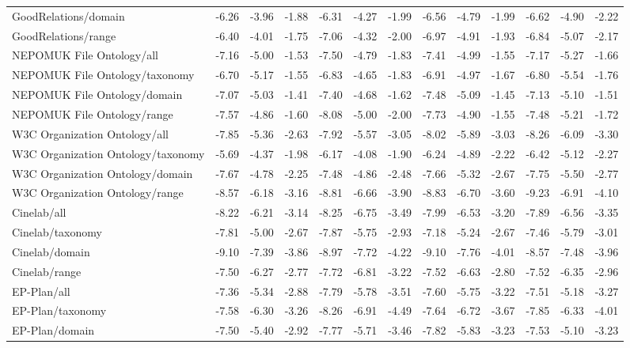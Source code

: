 \begin{tabular}{lcccccccccccc}
GoodRelations/domain & -6.26 & -3.96 & -1.88 & -6.31 & -4.27 & -1.99 & -6.56 & -4.79 & -1.99 & -6.62 & -4.90 & -2.22 \\
GoodRelations/range & -6.40 & -4.01 & -1.75 & -7.06 & -4.32 & -2.00 & -6.97 & -4.91 & -1.93 & -6.84 & -5.07 & -2.17 \\
NEPOMUK File Ontology/all & -7.16 & -5.00 & -1.53 & -7.50 & -4.79 & -1.83 & -7.41 & -4.99 & -1.55 & -7.17 & -5.27 & -1.66 \\
NEPOMUK File Ontology/taxonomy & -6.70 & -5.17 & -1.55 & -6.83 & -4.65 & -1.83 & -6.91 & -4.97 & -1.67 & -6.80 & -5.54 & -1.76 \\
NEPOMUK File Ontology/domain & -7.07 & -5.03 & -1.41 & -7.40 & -4.68 & -1.62 & -7.48 & -5.09 & -1.45 & -7.13 & -5.10 & -1.51 \\
NEPOMUK File Ontology/range & -7.57 & -4.86 & -1.60 & -8.08 & -5.00 & -2.00 & -7.73 & -4.90 & -1.55 & -7.48 & -5.21 & -1.72 \\
W3C Organization Ontology/all & -7.85 & -5.36 & -2.63 & -7.92 & -5.57 & -3.05 & -8.02 & -5.89 & -3.03 & -8.26 & -6.09 & -3.30 \\
W3C Organization Ontology/taxonomy & -5.69 & -4.37 & -1.98 & -6.17 & -4.08 & -1.90 & -6.24 & -4.89 & -2.22 & -6.42 & -5.12 & -2.27 \\
W3C Organization Ontology/domain & -7.67 & -4.78 & -2.25 & -7.48 & -4.86 & -2.48 & -7.66 & -5.32 & -2.67 & -7.75 & -5.50 & -2.77 \\
W3C Organization Ontology/range & -8.57 & -6.18 & -3.16 & -8.81 & -6.66 & -3.90 & -8.83 & -6.70 & -3.60 & -9.23 & -6.91 & -4.10 \\
Cinelab/all & -8.22 & -6.21 & -3.14 & -8.25 & -6.75 & -3.49 & -7.99 & -6.53 & -3.20 & -7.89 & -6.56 & -3.35 \\
Cinelab/taxonomy & -7.81 & -5.00 & -2.67 & -7.87 & -5.75 & -2.93 & -7.18 & -5.24 & -2.67 & -7.46 & -5.79 & -3.01 \\
Cinelab/domain & -9.10 & -7.39 & -3.86 & -8.97 & -7.72 & -4.22 & -9.10 & -7.76 & -4.01 & -8.57 & -7.48 & -3.96 \\
Cinelab/range & -7.50 & -6.27 & -2.77 & -7.72 & -6.81 & -3.22 & -7.52 & -6.63 & -2.80 & -7.52 & -6.35 & -2.96 \\
EP-Plan/all & -7.36 & -5.34 & -2.88 & -7.79 & -5.78 & -3.51 & -7.60 & -5.75 & -3.22 & -7.51 & -5.18 & -3.27 \\
EP-Plan/taxonomy & -7.58 & -6.30 & -3.26 & -8.26 & -6.91 & -4.49 & -7.64 & -6.72 & -3.67 & -7.85 & -6.33 & -4.01 \\
EP-Plan/domain & -7.50 & -5.40 & -2.92 & -7.77 & -5.71 & -3.46 & -7.82 & -5.83 & -3.23 & -7.53 & -5.10 & -3.23 \\

\end{tabular}

